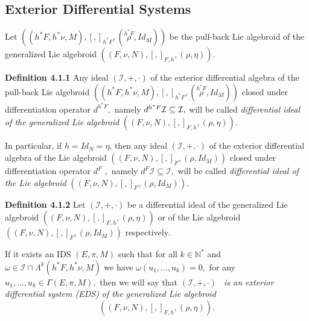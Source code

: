 \documentclass[11pt]{article}
\begin{document}
\subsection{Exterior Differential Systems}

Let $\left( \left( h^{\ast }F,h^{\ast }\nu ,M\right) ,\left[ ,\right]
_{h^{\ast }F},\left( \overset{h^{\ast }F}{\rho },Id_{M}\right) \right) $ be
the pull-back Lie algebroid of the generalized Lie algebroid $\left( \left(
F,\nu ,N\right) ,\left[ ,\right] _{F,h},\left( \rho ,\eta \right) \right) $.

\textbf{Definition 4.1.1 }Any ideal $\left( \mathcal{I},+,\cdot \right) $ of
the exterior differential algebra of the pull-back Lie algebroid $\left(
\left( h^{\ast }F,h^{\ast }\nu ,M\right) ,\left[ ,\right] _{h^{\ast
}F},\left( \overset{h^{\ast }F}{\rho },Id_{M}\right) \right) $ closed under
differentiation operator $d^{h^{\ast }F},$ namely $d^{h^{\ast }F}\mathcal{%
I\subseteq I},$ will be called \emph{differential ideal of the generalized
Lie algebroid }$\left( \left( F,\nu ,N\right) ,\left[ ,\right] _{F,h},\left(
\rho ,\eta \right) \right) .$

In particular, if $h=Id_{N}=\eta $, then any ideal $\left( \mathcal{I}%
,+,\cdot \right) $ of the exterior differential algebra of the Lie algebroid
$\left( \left( F,\nu ,N\right) ,\left[ ,\right] _{F},\left( \rho
,Id_{M}\right) \right) $ closed under differentiation operator $d^{F}$ $,$
namely $d^{F}\mathcal{I\subseteq I},$ will be called \emph{differential
ideal of the Lie algebroid }$\left( \left( F,\nu ,N\right) ,\left[ ,\right]
_{F},\left( \rho ,Id_{M}\right) \right) .$

\textbf{Definition 4.1.2 }Let $\left( \mathcal{I},+,\cdot \right) $ be a
differential ideal of the generalized Lie algebroid $\left( \left( F,\nu
,N\right) ,\left[ ,\right] _{F,h},\left( \rho ,\eta \right) \right) $ or of
the Lie algebroid $\left( \left( F,\nu ,N\right) ,\left[ ,\right]
_{F},\left( \rho ,Id_{M}\right) \right) $ respectively$.$

If it exists an IDS $\left( E,\pi ,M\right) $ such that for all $k\in
\mathbb{N}^{\ast }$ and $\omega \in \mathcal{I}\cap \Lambda ^{k}\left(
h^{\ast }F,h^{\ast }\nu ,M\right) $ we have $\omega \left(
u_{1},...,u_{k}\right) =0,$ for any $u_{1},...,u_{k}\in \Gamma \left( E,\pi
,M\right) ,$ then we will say that $\left( \mathcal{I},+,\cdot \right) $%
\emph{\ is an exterior differential system (EDS) of the generalized Lie
algebroid }%
\begin{equation*}
\left( \left( F,\nu ,N\right) ,\left[ ,\right] _{F,h},\left( \rho ,\eta
\right) \right) .
\end{equation*}
\end{document}
